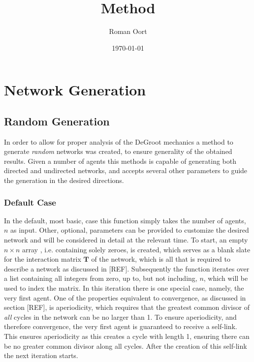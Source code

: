 \documentclass{article}
\title{Method}
\author{Roman Oort}
\date{\today}
\newcommand{\T}{\textbf{T}}
\begin{document}
\maketitle

\tableofcontents
\newpage
\section{Network Generation}

\subsection{Random Generation}

In order to allow for proper analysis of the DeGroot mechanics a method to generate \emph{random} networks was created, to ensure generality of the obtained results. Given a number of agents this methods is capable of generating both directed and undirected networks, and accepts several other parameters to guide the generation in the desired directions.

\subsubsection{Default Case}
In the default, most basic, case this function simply takes the number of agents, $n$ as input. Other, optional, parameters can be provided to customize the desired network and will be considered in detail at the relevant time.
To start, an empty $n\times n$ array , i.e. containing solely zeroes, is created, which serves as a blank slate for the interaction matrix $\T$ of the network, which is all that is required to describe a network as discussed in [REF].
Subsequently the function iterates over a list containing all integers from zero, up to, but not including, $n$, which will be used to index the matrix. \newline
In this iteration there is one special case, namely, the very first agent. One of the properties equivalent to convergence, as discussed in section [REF], is aperiodicity, which requires that the greatest common divisor of \emph{all} cycles in the network can be no larger than 1. To ensure aperiodicity, and therefore convergence, the very first agent is guaranteed to receive a self-link. This ensures aperiodicity as this creates a cycle with length 1, ensuring there can be no greater common divisor along all cycles. After the creation of this self-link the next iteration starts. \newline
\end{document}
